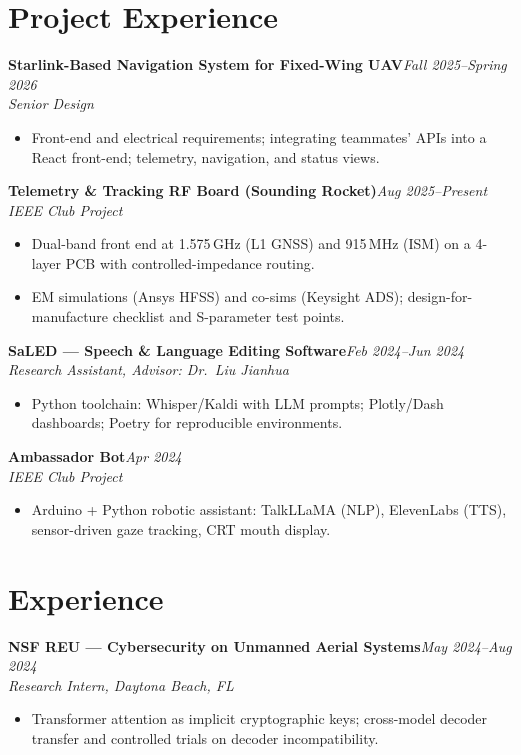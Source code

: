 \documentclass[10pt]{article}
\newcommand{\role}[2]{\textbf{#1}\hfill{\itshape #2}}
\begin{document}
\section*{Project Experience}
\role{Starlink-Based Navigation System for Fixed-Wing UAV}{Fall 2025–Spring 2026}\\
\emph{Senior Design}\\[-5pt]
\begin{itemize}
  \item Front-end and electrical requirements; integrating teammates' APIs into a React front-end; telemetry, navigation, and status views.
\end{itemize}

\role{Telemetry \& Tracking RF Board (Sounding Rocket)}{Aug 2025–Present}\\
\emph{IEEE Club Project}\\[-5pt]
\begin{itemize}
  \item Dual-band front end at 1.575\,GHz (L1 GNSS) and 915\,MHz (ISM) on a 4-layer PCB with controlled-impedance routing.
  \item EM simulations (Ansys HFSS) and co-sims (Keysight ADS); design-for-manufacture checklist and S-parameter test points.
\end{itemize}

\role{SaLED — Speech \& Language Editing Software}{Feb 2024–Jun 2024}\\
\emph{Research Assistant, Advisor: Dr.\ Liu Jianhua}\\[-5pt]
\begin{itemize}
  \item Python toolchain: Whisper/Kaldi with LLM prompts; Plotly/Dash dashboards; Poetry for reproducible environments.
\end{itemize}

\role{Ambassador Bot}{Apr 2024}\\
\emph{IEEE Club Project}\\[-5pt]
\begin{itemize}
  \item Arduino + Python robotic assistant: TalkLLaMA (NLP), ElevenLabs (TTS), sensor-driven gaze tracking, CRT mouth display.
\end{itemize}

\section*{Experience}
\role{NSF REU — Cybersecurity on Unmanned Aerial Systems}{May 2024–Aug 2024}\\
\emph{Research Intern, Daytona Beach, FL}\\[-5pt]
\begin{itemize}
  \item Transformer attention as implicit cryptographic keys; cross-model decoder transfer and controlled trials on decoder incompatibility.
\end{itemize}
\end{document}
